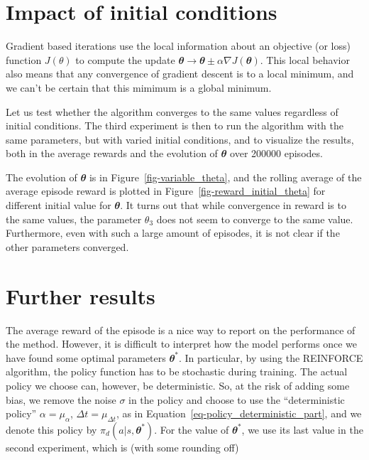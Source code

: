 \documentclass[
  letterpaper,
]{report}
\theoremstyle{plain}
\theoremstyle{definition}
\theoremstyle{definition}
\theoremstyle{remark}
\begin{document}
\hypertarget{impact-of-initial-conditions}{%
\section{Impact of initial
conditions}\label{impact-of-initial-conditions}}

Gradient based iterations use the local information about an objective
(or loss) function \(J(\theta)\) to compute the update
\(\mathbfit{\theta} \rightarrow \mathbfit{\theta} \pm \alpha \nabla J(\mathbfit{\theta})\).
This local behavior also means that any convergence of gradient descent
is to a local minimum, and we can't be certain that this mimimum is a
global minimum.

Let us test whether the algorithm converges to the same values
regardless of initial conditions. The third experiment is then to run
the algorithm with the same parameters, but with varied initial
conditions, and to visualize the results, both in the average rewards
and the evolution of \(\mathbfit{\theta}\) over 200000 episodes.

The evolution of \(\mathbfit{\theta}\) is in
Figure~\ref{fig-variable_theta}, and the rolling average of the average
episode reward is plotted in Figure~\ref{fig-reward_initial_theta} for
different initial value for \(\mathbfit{\theta}\). It turns out that
while convergence in reward is to the same values, the parameter
\(\theta_3\) does not seem to converge to the same value. Furthermore,
even with such a large amount of episodes, it is not clear if the other
parameters converged.

\hypertarget{further-results}{%
\section{Further results}\label{further-results}}

The average reward of the episode is a nice way to report on the
performance of the method. However, it is difficult to interpret how the
model performs once we have found some optimal parameters
\(\mathbfit{\theta}^*\). In particular, by using the REINFORCE
algorithm, the policy function has to be stochastic during training. The
actual policy we choose can, however, be deterministic. So, at the risk
of adding some bias, we remove the noise \(\sigma\) in the policy and
choose to use the ``deterministic policy'' \(\alpha = \mu_\alpha\),
\(\Delta t = \mu_{\Delta t}\), as in
Equation~\ref{eq-policy_deterministic_part}, and we denote this policy
by \(\pi_d(a|s,\mathbfit{\theta}^*)\). For the value of
\(\mathbfit{\theta}^*\), we use its last value in the second experiment,
which is (with some rounding off)
\end{document}
